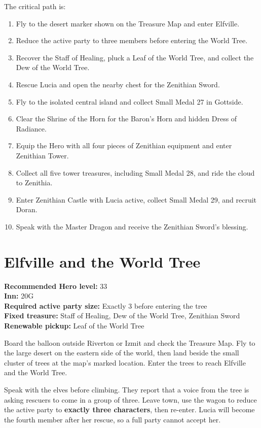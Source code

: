 \documentclass[
  american,
  10pt,
  letterpaper,
  oneside,
  open=any]{scrreprt}
\providecommand{\tightlist}{%
  \setlength{\itemsep}{0pt}\setlength{\parskip}{0pt}}
\begin{document}
The critical path is:

\begin{enumerate}
\def\labelenumi{\arabic{enumi}.}
\tightlist
\item
  Fly to the desert marker shown on the Treasure Map and enter Elfville.
\item
  Reduce the active party to three members before entering the World
  Tree.
\item
  Recover the Staff of Healing, pluck a Leaf of the World Tree, and
  collect the Dew of the World Tree.
\item
  Rescue Lucia and open the nearby chest for the Zenithian Sword.
\item
  Fly to the isolated central island and collect Small Medal 27 in
  Gottside.
\item
  Clear the Shrine of the Horn for the Baron's Horn and hidden Dress of
  Radiance.
\item
  Equip the Hero with all four pieces of Zenithian equipment and enter
  Zenithian Tower.
\item
  Collect all five tower treasures, including Small Medal 28, and ride
  the cloud to Zenithia.
\item
  Enter Zenithian Castle with Lucia active, collect Small Medal 29, and
  recruit Doran.
\item
  Speak with the Master Dragon and receive the Zenithian Sword's
  blessing.
\end{enumerate}

\section{Elfville and the World Tree}\label{elfville-and-the-world-tree}

\textbf{Recommended Hero level:} 33\\
\textbf{Inn:} 20G\\
\textbf{Required active party size:} Exactly 3 before entering the
tree\\
\textbf{Fixed treasure:} Staff of Healing, Dew of the World Tree,
Zenithian Sword\\
\textbf{Renewable pickup:} Leaf of the World Tree

Board the balloon outside Riverton or Izmit and check the Treasure Map.
Fly to the large desert on the eastern side of the world, then land
beside the small cluster of trees at the map's marked location. Enter
the trees to reach Elfville and the World Tree.

Speak with the elves before climbing. They report that a voice from the
tree is asking rescuers to come in a group of three. Leave town, use the
wagon to reduce the active party to \textbf{exactly three characters},
then re-enter. Lucia will become the fourth member after her rescue, so
a full party cannot accept her.
\end{document}

